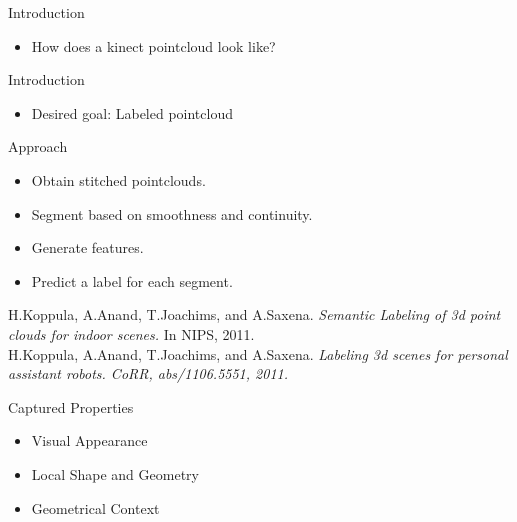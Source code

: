 \documentclass{beamer}
\begin{document}
\begin{frame}{Introduction}
	\begin{itemize}
		\item How does a kinect pointcloud look like?

	\end{itemize}
\end{frame}

\begin{frame}{Introduction}
	\begin{itemize}
		\item Desired goal: Labeled pointcloud

	\end{itemize}
\end{frame}

\begin{frame}{Approach}
	\begin{itemize}
		\item Obtain stitched pointclouds.
		\item Segment based on smoothness and continuity. 
		\item Generate features.
		\item Predict a label for each segment.
	\end{itemize}
	
	\vskip 0.5in
{\scriptsize 

 H.Koppula, A.Anand, T.Joachims, and A.Saxena. \emph{Semantic Labeling of 3d point clouds for indoor scenes.} In NIPS, 2011.\\
 H.Koppula, A.Anand, T.Joachims, and A.Saxena. \emph{Labeling 3d scenes for personal assistant robots. CoRR, abs/1106.5551, 2011.}
}
\end{frame}

\begin{frame}{Captured Properties}
	\begin{itemize}
		\item Visual Appearance
		\item  Local Shape and Geometry
		\item  Geometrical Context
	\end{itemize}

\end{frame}
\end{document}
